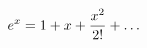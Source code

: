 \documentclass[preview]{standalone}
\begin{document}
\begin{align*}
e^x = 1 + x + {x^2 \over 2!} + \dots
\end{align*}
\end{document}
